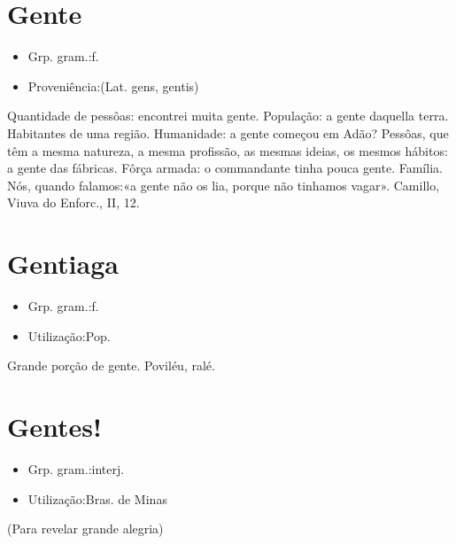 \section{Gente}
\begin{itemize}
\item {Grp. gram.:f.}
\end{itemize}
\begin{itemize}
\item {Proveniência:(Lat. \textunderscore gens\textunderscore , \textunderscore gentis\textunderscore )}
\end{itemize}
Quantidade de pessôas: \textunderscore encontrei muita gente\textunderscore .
População: \textunderscore a gente daquella terra\textunderscore .
Habitantes de uma região.
Humanidade: \textunderscore a gente começou em Adão?\textunderscore 
Pessôas, que têm a mesma natureza, a mesma profissão, as mesmas ideias, os mesmos hábitos: \textunderscore a gente das fábricas\textunderscore .
Fôrça armada: \textunderscore o commandante tinha pouca gente\textunderscore .
Família.
Nós, quando falamos:«\textunderscore a gente não os lia, porque não tinhamos vagar\textunderscore ». Camillo, \textunderscore Viuva do Enforc.\textunderscore , II, 12.
\section{Gentiaga}
\begin{itemize}
\item {Grp. gram.:f.}
\end{itemize}
\begin{itemize}
\item {Utilização:Pop.}
\end{itemize}
Grande porção de gente.
Poviléu, ralé.
\section{Gentes!}
\begin{itemize}
\item {Grp. gram.:interj.}
\end{itemize}
\begin{itemize}
\item {Utilização:Bras. de Minas}
\end{itemize}
(Para revelar grande alegria)
